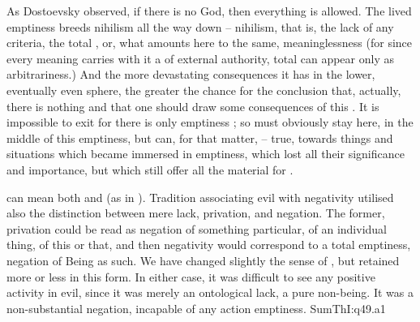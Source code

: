As Dostoevsky observed, if there is no God, then everything is
allowed.
%
The lived emptiness breeds nihilism all the way down -- nihilism, that is, the
lack of any criteria, the total ,  or, what
amounts here to the same, meaninglessness (for since every
meaning carries with it a  of external authority, total  can appear only as arbitrariness.) 
And the more devastating consequences
it has in the lower, eventually even  sphere, the greater the chance
for the conclusion that, actually, there is nothing and that one should draw
some consequences of this .  It is impossible to exit for there is
only emptiness ; so  must obviously stay here, in the
middle of this emptiness, but  can, for that matter,  -- true,
towards things and situations which became immersed in emptiness, which lost all
their significance and importance, but which still offer all the 
material for . 

\pa
{} can mean both  and  (as in ).
Tradition associating evil with negativity utilised also the distinction between
mere lack, privation, and  negation. The former, {privation} could be read as
negation of something particular, of an individual thing, of this or that, and
then negativity would correspond to a total emptiness, negation of
Being as such. We have changed slightly the sense of , but retained
 more or less in this form.
In either case, it was difficult to see any positive activity in evil, since it
was merely an ontological lack, a pure non-being. It was a non-substantial
negation, incapable of any action emptiness.  \citet{For evil is the absence of
  the good [...]  But only good can be a cause [...]}
{SumTh}{I:q49.a1}

